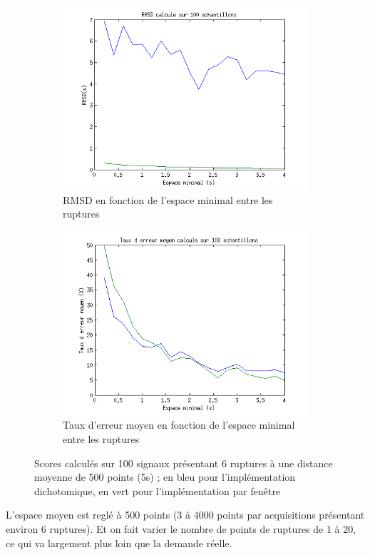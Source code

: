 \documentclass[french,11pt,notitlepage]{report}
\begin{document}
	\begin{figure}[!h]
		\begin{subfigure}[t]{.49\textwidth}
		  \includegraphics[width=\linewidth,height=.18\textheight]{rmsd_min}
			\caption{RMSD en fonction de l'espace minimal entre les ruptures}
			\label{}
		\end{subfigure}
		\hfill
		\begin{subfigure}[t]{.49\textwidth}
			\includegraphics[width=\linewidth,height=.18\textheight]{erratemean_min}
			\caption{Taux d'erreur moyen en fonction de l'espace minimal entre les ruptures}
			\label{}
		\end{subfigure}
	\caption{Scores calculés sur 100 signaux présentant 6 ruptures à une distance moyenne de 500 points (5s) ; en bleu pour l'implémentation dichotomique, en vert pour l'implémentation par fenêtre}
	\label{score_min}
	\end{figure}	
	L'espace moyen est reglé à 500 points (3 à 4000 points par acquisitions présentant environ 6 ruptures).	
	Et on fait varier le nombre de points de ruptures de 1 à 20, ce qui va largement plus loin que la demande réelle.
	\\
	
\end{document}
